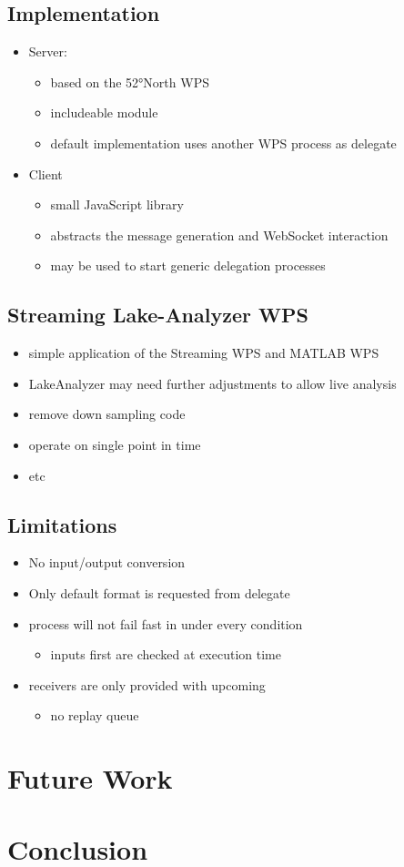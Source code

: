 	\section{Implementation}
	\begin{itemize}
		\item Server:
		\begin{itemize}
			\item based on the 52°North WPS
			\item includeable module
			\item default implementation uses another WPS process as delegate
		\end{itemize}
		\item Client
		\begin{itemize}
			\item small JavaScript library
			\item abstracts the message generation and WebSocket interaction
			\item may be used to start generic delegation processes
		\end{itemize}
	\end{itemize}
	\section{Streaming Lake-Analyzer WPS}
	\begin{itemize}
		\item simple application of the Streaming WPS and MATLAB WPS
		\item LakeAnalyzer may need further adjustments to allow live analysis
		\item remove down sampling code
		\item operate on single point in time
		\item etc
	\end{itemize}
	\section{Limitations}
	\begin{itemize}
		\item No input/output conversion
		\item Only default format is requested from delegate
		\item process will not fail fast in under every condition
		\begin{itemize}
			\item inputs first are checked at execution time
		\end{itemize}
		\item receivers are only provided with upcoming
		\begin{itemize}
			\item no replay queue
		\end{itemize}
	\end{itemize}
\chapter{Future Work}
\chapter{Conclusion}